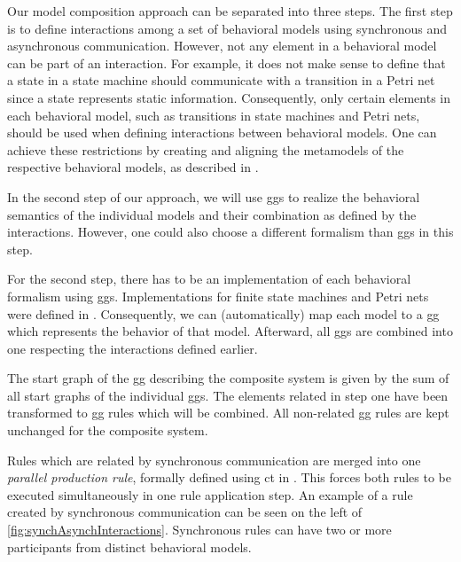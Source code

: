 \documentclass[a4paper]{easychair}
\begin{document}
Our model composition approach can be separated into three steps.
The first step is to define interactions among a set of behavioral models using synchronous and asynchronous communication.
However, not any element in a behavioral model can be part of an interaction.
For example, it does not make sense to define that a state in a state machine should communicate with a transition in a Petri net since a state represents static information.
Consequently, only certain elements in each behavioral model, such as transitions in state machines and Petri nets, should be used when defining interactions between behavioral models.
One can achieve these restrictions by creating and aligning the metamodels of the respective behavioral models, as described in \cite{krauterBehavioralConsistencyHeterogeneous2021}.

In the second step of our approach, we will use \glspl*{gg} to realize the behavioral semantics of the individual models and their combination as defined by the interactions.
However, one could also choose a different formalism than \glspl*{gg} in this step.

For the second step, there has to be an implementation of each behavioral formalism using \glspl*{gg}.
Implementations for finite state machines and Petri nets were defined in \cite{krauterBehavioralConsistencyHeterogeneous2021}.
Consequently, we can (automatically) map each model to a \gls*{gg} which represents the behavior of that model.
Afterward, all \glspl*{gg} are combined into one respecting the interactions defined earlier.

The start graph of the \gls*{gg} describing the composite system is given by the sum of all start graphs of the individual \glspl*{gg}.
The elements related in step one have been transformed to \gls*{gg} rules which will be combined.
All non-related \gls*{gg} rules are kept unchanged for the composite system.

Rules which are related by synchronous communication are merged into one \textit{parallel production rule}, formally defined using \gls*{ct} in \cite[Def. 3.2.7]{baldanConcurrentSemanticsAlgebraic1999}.
This forces both rules to be executed simultaneously in one rule application step. 
An example of a rule created by synchronous communication can be seen on the left of \autoref{fig:synchAsynchInteractions}.
Synchronous rules can have two or more participants from distinct behavioral models.  
\end{document}
